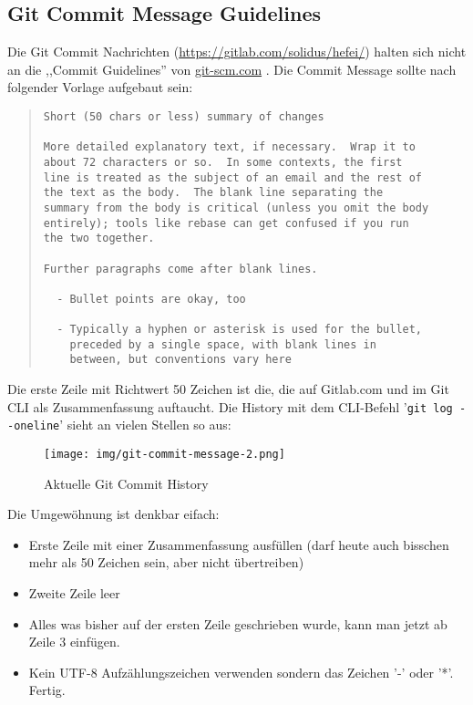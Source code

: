 \subsection{Git Commit Message Guidelines}
Die Git Commit Nachrichten (\url{https://gitlab.com/solidus/hefei/}) halten sich nicht an die ,,Commit Guidelines'' von \href{https://git-scm.com/book/en/v2/Distributed-Git-Contributing-to-a-Project}{git-scm.com} \cite{git-scm.com-guide}. Die Commit Message sollte nach folgender Vorlage aufgebaut sein:
\begin{quote}
\begin{lstlisting}[language=none,caption={Template einer Git commit message}]
Short (50 chars or less) summary of changes

More detailed explanatory text, if necessary.  Wrap it to
about 72 characters or so.  In some contexts, the first
line is treated as the subject of an email and the rest of
the text as the body.  The blank line separating the
summary from the body is critical (unless you omit the body
entirely); tools like rebase can get confused if you run
the two together.

Further paragraphs come after blank lines.

  - Bullet points are okay, too

  - Typically a hyphen or asterisk is used for the bullet,
    preceded by a single space, with blank lines in
    between, but conventions vary here

\end{lstlisting}
\end{quote}
Die erste Zeile mit Richtwert 50 Zeichen ist die, die auf Gitlab.com und im Git CLI als Zusammenfassung auftaucht. Die History mit dem CLI-Befehl '\verb|git log --oneline|' sieht an vielen Stellen so aus:
\begin{figure}[H]
	\centering
	\texttt{[image: img/git-commit-message-2.png]}
	\caption{Aktuelle Git Commit History}
	\label{fig:git-commit-message}
\end{figure}
Die Umgewöhnung ist denkbar eifach:
\begin{itemize}
	\item Erste Zeile mit einer Zusammenfassung ausfüllen (darf heute auch bisschen mehr als 50 Zeichen sein, aber nicht übertreiben)
	\item Zweite Zeile leer
	\item Alles was bisher auf der ersten Zeile geschrieben wurde, kann man jetzt ab Zeile 3 einfügen.
	\item Kein UTF-8 Aufzählungszeichen verwenden sondern das Zeichen '-' oder '*'. Fertig.
\end{itemize}

